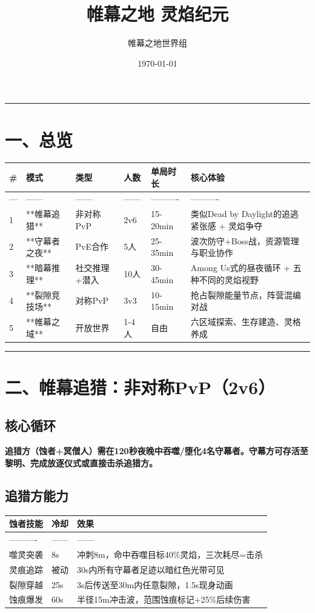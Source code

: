 \documentclass[12pt,a4paper,openany]{ctexbook}
\begin{document}
\title{帷幕之地 \cdot 灵焰纪元}
\author{帷幕之地世界组}
\date{\today}
\maketitle
\tableofcontents
\newpage


\bigskip\hrule\bigskip


\chapter{一、总览}


\begin{tabular}{|l|l|l|l|l|l|}
\hline
\# & 模式 & 类型 & 人数 & 单局时长 & 核心体验 \\
\hline
--- & ------ & ------ & ------ & ---------- & ---------- \\
1 & **帷幕追猎** & 非对称PvP & 2v6 & 15-20min & 类似Dead by Daylight的追逃紧张感 + 灵焰争夺 \\
2 & **守幕者之夜** & PvE合作 & 5人 & 25-35min & 波次防守+Boss战，资源管理与职业协作 \\
3 & **暗幕推理** & 社交推理+潜入 & 10人 & 30-45min & Among Us式的昼夜循环 + 五种不同的灵焰视野 \\
4 & **裂隙竞技场** & 对称PvP & 3v3 & 10-15min & 抢占裂隙能量节点，阵营混编对战 \\
5 & **帷幕之域** & 开放世界 & 1-4人 & 自由 & 六区域探索、生存建造、灵格养成 \\
\hline
\end{tabular}


\bigskip\hrule\bigskip


\chapter{二、帷幕追猎：非对称PvP（2v6）}


\section*{核心循环}


\textbf{追猎方（蚀者+冥僧人）需在120秒夜晚中吞噬/堕化4名守幕者。守幕方可存活至黎明、完成放逐仪式或直接击杀追猎方。}


\section*{追猎方能力}


\begin{tabular}{|l|l|l|}
\hline
蚀者技能 & 冷却 & 效果 \\
\hline
---------- & ------ & ------ \\
噬灵突袭 & 8s & 冲刺8m，命中吞噬目标40\%灵焰，三次耗尽=击杀 \\
灵痕追踪 & 被动 & 30s内所有守幕者足迹以暗红色光带可见 \\
裂隙穿越 & 25s & 3s后传送至30m内任意裂隙，1.5s现身动画 \\
蚀痕爆发 & 60s & 半径15m冲击波，范围蚀痕标记+25\%后续伤害 \\
\hline
\end{tabular}
\end{document}
